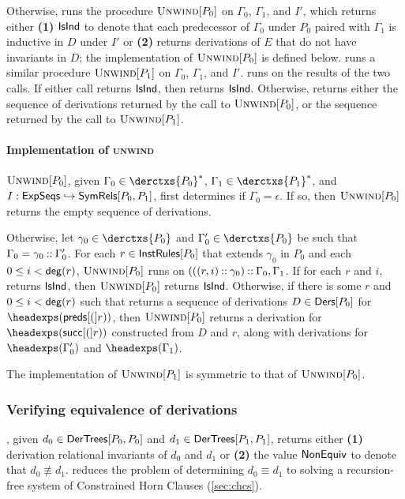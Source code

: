 Otherwise, \chkindaux runs the procedure $\textsc{Unwind}[ P_0 ]$ on $\Gamma_0$,
$\Gamma_1$, and $I'$, which returns either \textbf{(1)} $\mathsf{IsInd}$ to
denote that each predecessor of $\Gamma_0$ under $P_0$
%
%
paired with $\Gamma_1$ is inductive in $D$ under $I'$ or %
\textbf{(2)} returns derivations of $E$ that do not have invariants in
$D$;
%
the implementation of $\textsc{Unwind}[ P_0 ]$ is defined below.
%
\chkindaux runs a similar procedure $\textsc{Unwind}[ P_1 ]$ on $\Gamma_0$,
$\Gamma_1$, and $I'$.
\chkindaux runs \chooseres on the results of the two calls.
%
If either call returns $\mathsf{IsInd}$, then \chooseres returns $\mathsf{IsInd}$.
%
Otherwise, \chooseres returns either the sequence of derivations
returned by the call to $\textsc{Unwind}[ P_0 ]$, or the sequence returned by
the call to $\textsc{Unwind}[ P_1 ]$.

\paragraph{Implementation of \textsc{unwind}}
%
$\textsc{Unwind}[ P_0 ]$, given $\Gamma_0 \in \derctxs{P_0}^{*}$, $\Gamma_1 \in
\derctxs{P_1}^{*}$, and $I : \mathsf{ExpSeqs} \hookrightarrow \mathsf{SymRels}[ P_0, P_1 ]$,
first determines if $\Gamma_0 = \epsilon$.
%
If so, then $\textsc{Unwind}[ P_0 ]$ returns the empty sequence of derivations.

Otherwise, let $\gamma_0 \in \derctxs{P_0}$ and $\Gamma_0' \in
\derctxs{P_0}$ be such that $\Gamma_0 = \gamma_0 \mathbin{::} \Gamma_0'$.
%
For each $r \in \mathsf{InstRules}[ P_0 ]$ that extends $\gamma_0$ in $P_0$ and
each $0 \leq i < \mathsf{deg}(r)$, $\textsc{Unwind}[ P_0 ]$ runs \chkindaux on
$(((r, i) \mathbin{::} \gamma_0) \mathbin{::} \Gamma_0, \Gamma_1$.
%
If for each $r$ and $i$, \chkindaux returns $\mathsf{IsInd}$, then
$\textsc{Unwind}[ P_0 ]$ returns $\mathsf{IsInd}$.
%
Otherwise, if there is some $r$ and $0 \leq i < \mathsf{deg}(r)$ such
that \chkindaux returns a sequence of derivations $D \in \mathsf{Ders}[ P_0 ]$
for $\headexps(\rulepreds(r))$, then $\textsc{Unwind}[ P_0 ]$ returns a
derivation for $\headexps(\rulesucc(r))$ constructed from $D$ and $r$,
along with derivations for $\headexps(\Gamma_0')$ and
$\headexps(\Gamma_1)$.

The implementation of $\textsc{Unwind}[ P_1 ]$ is symmetric to that of
$\textsc{Unwind}[ P_0 ]$.

\subsubsection{Verifying equivalence of derivations}
\label{sec:verify-ders}
%
\verifyders, given $d_0 \in \mathsf{DerTrees}[  P_0 ,  P_0  ]$ and %
$d_1 \in \mathsf{DerTrees}[  P_1 ,  P_1  ]$, returns either \textbf{(1)}
derivation relational invariants of $d_0$ and $d_1$ or %
\textbf{(2)} the value $\mathsf{NonEquiv}$ to denote that $d_0 \not\equiv
d_1$.
%
\verifyders reduces the problem of determining $d_0 \equiv d_1$ to
solving a recursion-free system of Constrained Horn Clauses
(\autoref{sec:chcs}).

